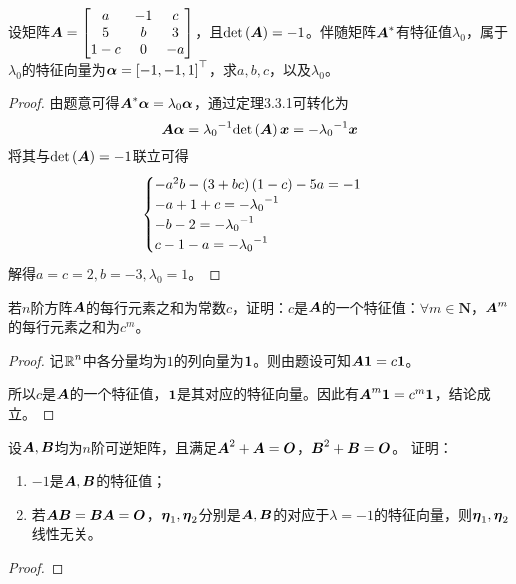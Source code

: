 \begin{problem}
设矩阵\(\boldsymbol{A}=\begin{bmatrix}a&-1&c\\5&b&3\\1-c&0&-a\end{bmatrix}\)，且\(\mathrm{det}\left( \boldsymbol{A} \right)=-1\)。伴随矩阵\(\boldsymbol{A}^*\)有特征值\(\lambda_0\)，属于\(\lambda_0\)的特征向量为\(\boldsymbol{\alpha}=\left[ -1,-1,1 \right]^\top\)，求\(a,b,c\)，以及\(\lambda_0\)。
\end{problem}
\begin{proof}
    由题意可得\(\boldsymbol{A}^*\boldsymbol{\alpha}=\lambda_0\boldsymbol{\alpha}\)，通过定理3.3.1可转化为
    \begin{equation*}
        \boldsymbol{A}\boldsymbol{\alpha}={\lambda_0}^{-1}\mathrm{det}\left( \boldsymbol{A} \right)\boldsymbol{x}=-{\lambda_0}^{-1}\boldsymbol{x}
    \end{equation*}
    将其与\(\mathrm{det}\left( \boldsymbol{A} \right)=-1\)联立可得
    \begin{equation*}
        \begin{cases}
            -a^2b-\left( 3+bc \right)\left( 1-c \right)-5a=-1 \\
            -a+1+c=-{\lambda_0}^{-1}           \\
            -b-2=-{\lambda_0}^{-1}             \\
            c-1-a=-{\lambda_0}^{-1}
        \end{cases}
    \end{equation*}
    解得\(a=c=2,b=-3,\lambda_0=1\)。
\end{proof}

\begin{problem}
若\(n\)阶方阵\(\boldsymbol{A}\)的每行元素之和为常数\(c\)，证明：\(c\)是\(\boldsymbol{A}\)的一个特征值：\(\forall m\in\mathbf{N}\)，\(\boldsymbol{A}^m\)的每行元素之和为\(c^m\)。
\end{problem}
\begin{proof}
    记\(\boldsymbol{\mathbb{R}}^n\)中各分量均为\(1\)的列向量为\(\boldsymbol{1}\)。则由题设可知\(\boldsymbol{A}\boldsymbol{1}=c\boldsymbol{1}\)。

    所以\(c\)是\(\boldsymbol{A}\)的一个特征值，\(\boldsymbol{1}\)是其对应的特征向量。因此有\(\boldsymbol{A}^m\boldsymbol{1}=c^m\boldsymbol{1}\)，结论成立。
\end{proof}

\begin{problem}
设\(\boldsymbol{A},\boldsymbol{B}\)均为\(n\)阶可逆矩阵，且满足\(\boldsymbol{A}^2+\boldsymbol{A}=\boldsymbol{O}\)，\(\boldsymbol{B}^2+\boldsymbol{B}=\boldsymbol{O}\)。
证明：
\begin{enumerate}
    \item \(-1\)是\(\boldsymbol{A},\boldsymbol{B}\)的特征值；
    \item 若\(\boldsymbol{A}\boldsymbol{B}=\boldsymbol{B}\boldsymbol{A}=\boldsymbol{O}\)，\(\boldsymbol{\eta}_1,\boldsymbol{\eta}_2\)分别是\(\boldsymbol{A},\boldsymbol{B}\)的对应于\(\lambda=-1\)的特征向量，则\(\boldsymbol{\eta}_1,\boldsymbol{\eta}_2\)线性无关。
\end{enumerate}
\end{problem}
\begin{proof}
\end{proof}

